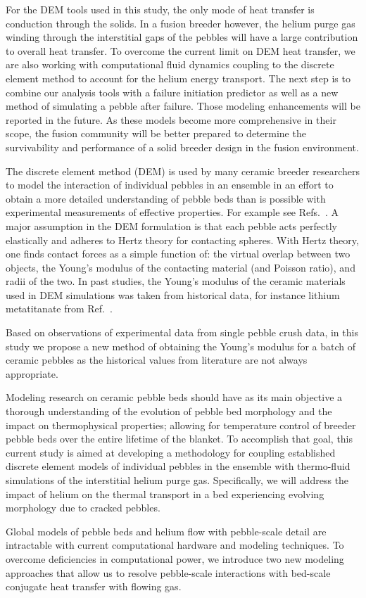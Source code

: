 For the DEM tools used in this study, the only mode of heat transfer is conduction through the solids. In a fusion breeder however, the helium purge gas winding through the interstitial gaps of the pebbles will have a large contribution to overall heat transfer\cite{Reimann:2002mi,Abou-Sena2005}. To overcome the current limit on DEM heat transfer, we are also working with computational fluid dynamics coupling to the discrete element method to account for the helium energy transport. The next step is to combine our analysis tools with a failure initiation predictor as well as a new method of simulating a pebble after failure. Those modeling enhancements will be reported in the future. As these models become more comprehensive in their scope, the fusion community will be better prepared to determine the survivability and performance of a solid breeder design in the fusion environment.


The discrete element method (DEM) is used by many ceramic breeder researchers to model the interaction of individual pebbles in an ensemble in an effort to obtain a more detailed understanding of pebble beds than is possible with experimental measurements of effective properties. For example see Refs.~\cite{An20071393, Lu2000, Zhao2010, Gan2010a, Annabattula2012a, VanLew2014}. A major assumption in the DEM formulation is that each pebble acts perfectly elastically and adheres to Hertz theory for contacting spheres. With Hertz theory, one finds contact forces as a simple function of: the virtual overlap between two objects, the Young's modulus of the contacting material (and Poisson ratio), and radii of the two. In past studies, the Young's modulus of the ceramic materials  used in DEM simulations was taken from historical data, for instance lithium metatitanate from Ref.~\cite{Gierszewski1998}.

Based on observations of experimental data from single pebble crush data, in this study we propose a new method of obtaining the Young's modulus for a batch of ceramic pebbles as the historical values from literature are not always appropriate.




Modeling research on ceramic pebble beds should have as its main objective a thorough understanding of the evolution of pebble bed morphology and the impact on thermophysical properties; allowing for temperature control of breeder pebble beds over the entire lifetime of the blanket. To accomplish that goal, this current study is aimed at developing a methodology for coupling established discrete element models of individual pebbles in the ensemble with thermo-fluid simulations of the interstitial helium purge gas. Specifically, we will address the impact of helium on the thermal transport in a bed experiencing evolving morphology due to cracked pebbles.

Global models of pebble beds and helium flow with pebble-scale detail are intractable with current computational hardware and modeling techniques. To overcome deficiencies in computational power, we introduce two new modeling approaches that allow us to resolve pebble-scale interactions with bed-scale conjugate heat transfer with flowing gas.